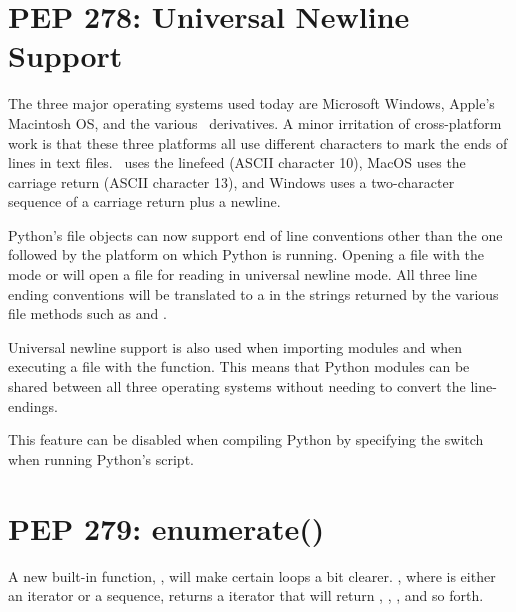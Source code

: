 \documentclass{howto}
\begin{document}
\section{PEP 278: Universal Newline Support}

The three major operating systems used today are Microsoft Windows,
Apple's Macintosh OS, and the various \UNIX\ derivatives.  A minor
irritation of cross-platform work 
is that these three platforms all use different characters
to mark the ends of lines in text files.  \UNIX\ uses the linefeed
(ASCII character 10), MacOS uses the carriage return (ASCII
character 13), and Windows uses a two-character sequence of a
carriage return plus a newline.

Python's file objects can now support end of line conventions other
than the one followed by the platform on which Python is running.
Opening a file with the mode  or  will open a file
for reading in universal newline mode.  All three line ending
conventions will be translated to a  in the strings
returned by the various file methods such as  and
.

Universal newline support is also used when importing modules and when
executing a file with the  function.  This means
that Python modules can be shared between all three operating systems
without needing to convert the line-endings.

This feature can be disabled when compiling Python by specifying
the  switch when running Python's
 script.

\begin{seealso}


\end{seealso}


\section{PEP 279: enumerate()\label{section-enumerate}}

A new built-in function, , will make
certain loops a bit clearer.  , where
 is either an iterator or a sequence, returns a iterator
that will return , , , and so forth.  
\end{document}
